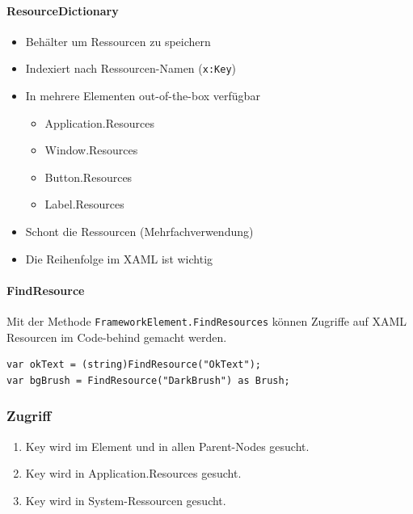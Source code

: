 \paragraph{ResourceDictionary} 
\begin{itemize}
    \item Behälter um Ressourcen zu speichern
    \item Indexiert nach Ressourcen-Namen (\verb+x:Key+)
    \item In mehrere Elementen out-of-the-box verfügbar
    \begin{itemize}
        \item Application.Resources
        \item Window.Resources
        \item Button.Resources
        \item Label.Resources
    \end{itemize}
    \item Schont die Ressourcen (Mehrfachverwendung)
    \item Die Reihenfolge im XAML ist wichtig
\end{itemize}



\paragraph{FindResource} Mit der Methode \verb+FrameworkElement.FindResources+  können Zugriffe auf XAML Resourcen im Code-behind gemacht werden.
\begin{lstlisting}
var okText = (string)FindResource("OkText");
var bgBrush = FindResource("DarkBrush") as Brush;
\end{lstlisting}

\subsubsection{Zugriff}
\begin{enumerate}
    \item Key wird im Element und in allen Parent-Nodes gesucht.
    \item Key wird in Application.Resources gesucht.
    \item Key wird in System-Ressourcen gesucht.
\end{enumerate}

